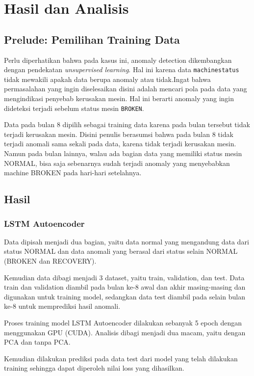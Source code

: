 \chapter{Hasil dan Analisis} 

\section{Prelude: Pemilihan Training Data}

Perlu diperhatikan bahwa pada kasus ini, anomaly detection dikembangkan dengan pendekatan \emph{unsupervised learning}. Hal ini karena data \texttt{machine\textunderscore status} tidak mewakili apakah data berupa anomaly atau tidak.Ingat bahwa permasalahan yang ingin diselesaikan disini adalah mencari pola pada data yang mengindikasi penyebab kerusakan mesin. Hal ini berarti anomaly yang ingin dideteksi terjadi sebelum status mesin \texttt{BROKEN}. 

Data pada bulan 8 dipilih sebagai training data karena pada bulan tersebut tidak terjadi kerusakan mesin. Disini penulis berasumsi bahwa pada bulan 8 tidak terjadi anomali sama sekali pada data, karena tidak terjadi kerusakan mesin. Namun pada bulan lainnya, walau ada bagian data yang memiliki status mesin NORMAL, bisa saja sebenarnya sudah terjadi anomaly yang menyebabkan machine BROKEN pada hari-hari setelahnya.

\section{Hasil}
\subsection{LSTM Autoencoder}

Data dipisah menjadi dua bagian, yaitu data normal yang mengandung data dari status NORMAL dan data anomali yang berasal dari status selain NORMAL (BROKEN dan RECOVERY).

Kemudian data dibagi menjadi 3 dataset, yaitu train, validation, dan test. Data train dan validation diambil pada bulan ke-8 awal dan akhir masing-masing dan digunakan untuk training model, sedangkan data test diambil pada selain bulan ke-8 untuk memprediksi hasil anomali.

Proses training model LSTM Autoencoder dilakukan sebanyak 5 epoch dengan menggunakan GPU (CUDA). Analisis dibagi menjadi dua macam, yaitu dengan PCA dan tanpa PCA.

Kemudian dilakukan prediksi pada data test dari model yang telah dilakukan training sehingga dapat diperoleh nilai loss yang dihasilkan.

